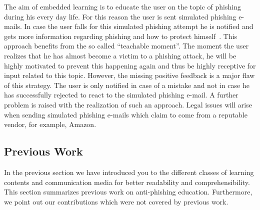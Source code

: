 \begin{description}[leftmargin=0cm]
	\item[Emdedded Learning] The aim of embedded learning is to educate the user on the topic of phishing during his every day life.
 For this reason the user is sent simulated phishing e-mails.
 In case the user falls for this simulated phishing attempt he is notified and gets more information regarding phishing and how to protect himself~\cite{embedded2011jansson, kumaraguru2009phishguru}. This approach benefits from the so called ``teachable moment''. The moment the user realizes that he has almost become a victim to a phishing attack, he will be highly motivated to prevent this happening again and thus be highly receptive for input related to this topic.
 However, the missing positive feedback is a major flaw of this strategy.
 The user is only notified in case of a mistake and not in case he has successfully rejected to react to the simulated phishing e-mail.
 A further problem is raised with the realization of such an approach.
 Legal issues will arise when sending simulated phishing e-mails which claim to come from a reputable vendor, for example, Amazon.

\end{description}

\subsection{Previous Work}
\label{s:prev_work}
In the previous section we have introduced you to the different classes of learning contents and communication media for better readability and comprehensibility. 
This section summarizes previous work on anti-phishing education. 
Furthermore, we point out our contributions which were not covered by previous work.

